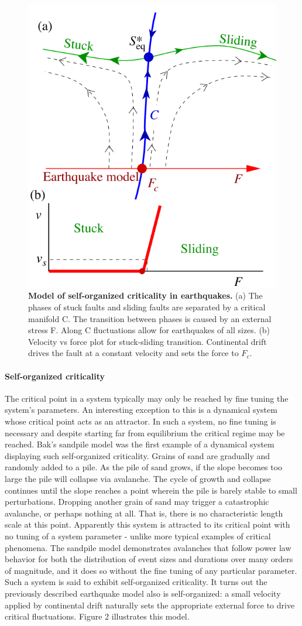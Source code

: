 \documentclass[12pt]{article}
\begin{document}
\begin{figure}      
  \begin{center}    
 \includegraphics[width=.30\textwidth]{sethnaRGquakes}    
    \caption{\textbf{Model of self-organized criticality in earthquakes.} (a) The phases of stuck faults and sliding faults are separated by a critical manifold C. The transition between phases is caused by an external stress F. Along C fluctuations allow for earthquakes of all sizes. (b) Velocity vs force plot for stuck-sliding transition. Continental drift drives the fault at a constant velocity and sets the force to $F_{c}$. \cite{Sethna2011a}}   
   \label{Figure::Power law behavior in earthquakes}   
  \end{center}     
   \end{figure}

\paragraph{Self-organized criticality} 

The critical point in a system typically may only be reached by fine tuning the system's parameters. An interesting exception to this is a dynamical system whose critical point acts as an attractor. In such a system, no fine tuning is necessary and despite starting far from equilibrium the critical regime may be reached. Bak's sandpile model\cite{Bak1987a} was the first example of a dynamical system displaying such self-organized criticality. Grains of sand are gradually and randomly added to a pile. As the pile of sand grows, if the slope becomes too large the pile will collapse via avalanche. The cycle of growth and collapse continues until the slope reaches a point wherein the pile is barely stable to small perturbations. Dropping another grain of sand may trigger a catastrophic avalanche, or perhaps nothing at all. That is, there is no characteristic length scale at this point. Apparently this system is attracted to its critical point with no tuning of a system parameter - unlike more typical examples of critical phenomena. The sandpile model demonstrates avalanches that follow power law behavior for both the distribution of event sizes and durations over many orders of magnitude, and it does so without the fine tuning of any particular parameter. Such a system is said to exhibit self-organized criticality. It turns out the previously described earthquake model also is self-organized: a small velocity applied by continental drift naturally sets the appropriate external force to drive critical fluctuations\cite{Sethna2011a}. Figure 2 illustrates this model. 
\end{document}

